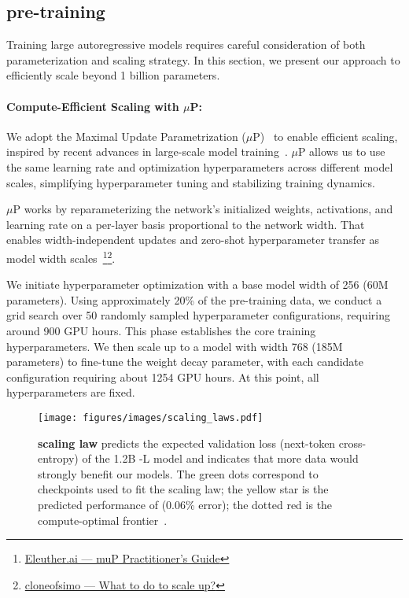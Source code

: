 


\subsection{\vm{} pre-training}
\label{subsec:muP}

Training large autoregressive models requires careful consideration of both parameterization and scaling strategy. In this section, we present our approach to efficiently scale \vm{} beyond 1 billion parameters.
\paragraph{Compute-Efficient Scaling with $\mu$P:} 
We adopt the Maximal Update Parametrization ($\mu$P)~\cite{yang2022miup} to enable efficient scaling, inspired by recent advances in large-scale model training~\cite{hu2024minicpm,dey2023cerebras,yao2023nanolm,li2023flm101b}. $\mu$P allows us to use the same learning rate and optimization hyperparameters across different model scales, simplifying hyperparameter tuning and stabilizing training dynamics.

$\mu$P works by reparameterizing the network's initialized weights, activations, and learning rate on a per-layer basis proportional to the network width. That enables width-independent updates and zero-shot hyperparameter transfer as model width scales~\cite{lingle2024largescalemiup, yao2023nanolm}\footnote{\href{https://blog.eleuther.ai/mutransfer/}{Eleuther.ai --- muP Practitioner's Guide}}\footnote{\href{https://cloneofsimo.notion.site/What-to-do-to-scale-up-09e469d7c3444d6a90305397c38a46f5}{cloneofsimo --- What to do to scale up?}}.

We initiate hyperparameter optimization with a base model width of 256 (60M parameters). Using approximately 20\% of the pre-training data, we conduct a grid search over 50 randomly sampled hyperparameter configurations, requiring around 900 GPU hours. This phase establishes the core training hyperparameters. We then scale up to a model with width 768 (185M parameters) to fine-tune the weight decay parameter, with each candidate configuration requiring about 1254 GPU hours. At this point, all hyperparameters are fixed.



\begin{figure}[h]
    \centering
    \texttt{[image: figures/images/scaling\_laws.pdf]}
    \caption{\textbf{\vm{} scaling law} predicts the expected validation loss (next-token cross-entropy) of the 1.2B \vm{}-L model and indicates that more data would strongly benefit our models. The green dots correspond to checkpoints used to fit the scaling law; the yellow star is the predicted performance of \vm{} (0.06\% error); the dotted red is the compute-optimal frontier~\cite{hoffmann2022chinchilla}.}
    \label{fig:scaling_law}
\end{figure}


